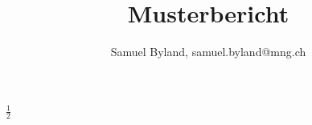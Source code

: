 \documentclass[11pt, oneside]{article}   	%
\title{Musterbericht}
\author{Samuel Byland, samuel.byland@mng.ch}
\begin{document}
\maketitle
\section{}
$\frac{1}{2}$

\subsection{}
\end{document}
